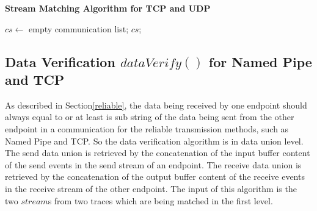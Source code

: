 \begin{algorithm}[H]
\DontPrintSemicolon
\caption{{\bf Stream Matching Algorithm for TCP and UDP} \label{channelAlg2}}
$cs \leftarrow$ empty communication list;\;
\KwRet $cs$;\;
\end{algorithm}

\subsection{Data Verification $dataVerify()$ for Named Pipe and TCP}
As described in Section\ref{reliable}, the data being received by one endpoint should always equal to or at least is sub string of the data being sent from the other endpoint in a communication for the reliable transmission methods, such as Named Pipe and TCP. So the data verification algorithm is in data union level. The send data union is retrieved by the concatenation of the input buffer content of the send events in the send stream of an endpoint. The receive data union is retrieved by the concatenation of the output buffer content of the receive events in the receive stream of the other endpoint. The input of this algorithm is the two $stream$s from two traces which are being matched in the first level.

